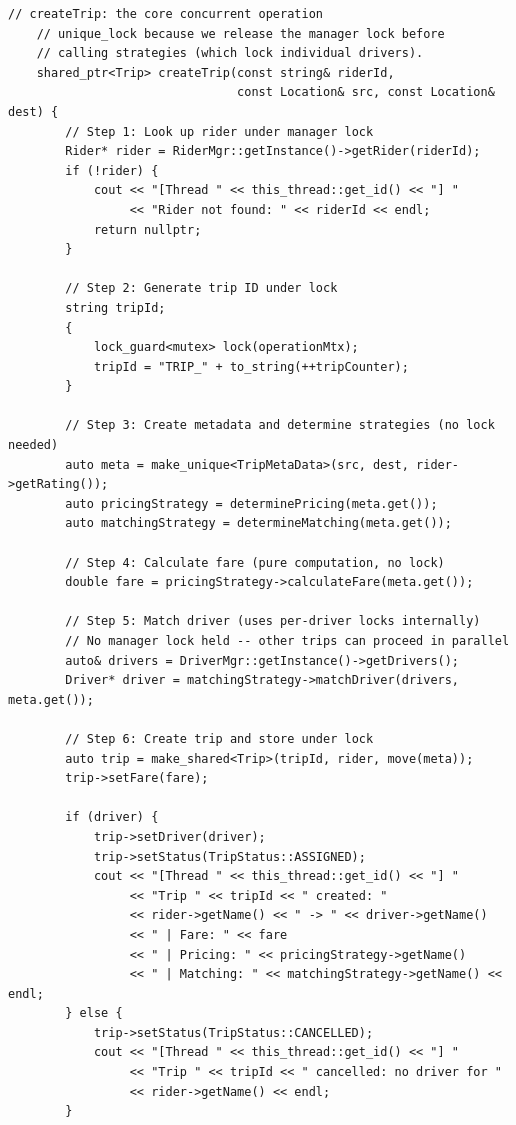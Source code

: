 \documentclass[11pt,a4paper]{article}
\begin{document}
\begin{lstlisting}[title={\texttt{managers.hpp}}]
    // createTrip: the core concurrent operation
    // unique_lock because we release the manager lock before
    // calling strategies (which lock individual drivers).
    shared_ptr<Trip> createTrip(const string& riderId,
                                const Location& src, const Location& dest) {
        // Step 1: Look up rider under manager lock
        Rider* rider = RiderMgr::getInstance()->getRider(riderId);
        if (!rider) {
            cout << "[Thread " << this_thread::get_id() << "] "
                 << "Rider not found: " << riderId << endl;
            return nullptr;
        }

        // Step 2: Generate trip ID under lock
        string tripId;
        {
            lock_guard<mutex> lock(operationMtx);
            tripId = "TRIP_" + to_string(++tripCounter);
        }

        // Step 3: Create metadata and determine strategies (no lock needed)
        auto meta = make_unique<TripMetaData>(src, dest, rider->getRating());
        auto pricingStrategy = determinePricing(meta.get());
        auto matchingStrategy = determineMatching(meta.get());

        // Step 4: Calculate fare (pure computation, no lock)
        double fare = pricingStrategy->calculateFare(meta.get());

        // Step 5: Match driver (uses per-driver locks internally)
        // No manager lock held -- other trips can proceed in parallel
        auto& drivers = DriverMgr::getInstance()->getDrivers();
        Driver* driver = matchingStrategy->matchDriver(drivers, meta.get());

        // Step 6: Create trip and store under lock
        auto trip = make_shared<Trip>(tripId, rider, move(meta));
        trip->setFare(fare);

        if (driver) {
            trip->setDriver(driver);
            trip->setStatus(TripStatus::ASSIGNED);
            cout << "[Thread " << this_thread::get_id() << "] "
                 << "Trip " << tripId << " created: "
                 << rider->getName() << " -> " << driver->getName()
                 << " | Fare: " << fare
                 << " | Pricing: " << pricingStrategy->getName()
                 << " | Matching: " << matchingStrategy->getName() << endl;
        } else {
            trip->setStatus(TripStatus::CANCELLED);
            cout << "[Thread " << this_thread::get_id() << "] "
                 << "Trip " << tripId << " cancelled: no driver for "
                 << rider->getName() << endl;
        }


\end{lstlisting}
\end{document}
